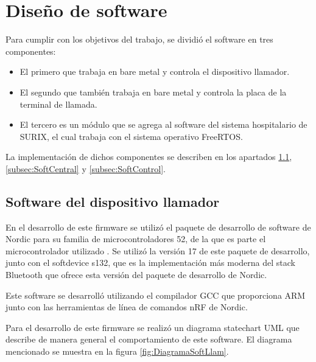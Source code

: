 
\section{Diseño de software}

Para cumplir con los objetivos del trabajo, se dividió el software en tres componentes:

\begin{itemize}

\item El primero que trabaja en bare metal y controla el dispositivo llamador.

\item El segundo que también trabaja en bare metal y controla la placa de la terminal de llamada.

\item El tercero es un módulo que se agrega al software del sistema hospitalario de SURIX, el cual trabaja con el sistema operativo FreeRTOS.

\end{itemize}

La implementación de dichos componentes se describen en los apartados \ref{subsec:SoftLlam}, \ref{subsec:SoftCentral} y \ref{subsec:SoftControl}.

\subsection{Software del dispositivo llamador}
\label{subsec:SoftLlam}

En el desarrollo de este firmware se utilizó el paquete de desarrollo de software de Nordic para su familia de microcontroladores 52, de la que es parte el microcontrolador utilizado \citep{SDK}. Se utilizó la versión 17 de este paquete de desarrollo,  junto con el softdevice s132, que es la implementación más moderna del stack Bluetooth que ofrece esta versión del paquete de desarrollo de Nordic.

Este software se desarrolló utilizando el compilador GCC que proporciona ARM junto con las herramientas de línea de comandos nRF de Nordic.

Para el desarrollo de este firmware se realizó un diagrama statechart UML que describe de manera general el comportamiento de este software. El diagrama mencionado se muestra en la figura \ref{fig:DiagramaSoftLlam}.

